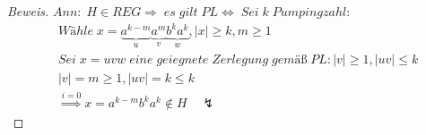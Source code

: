 \begin{proof}[Beweis]
	\begin{math}
		Ann:\;H\in REG\Rightarrow\;es\;gilt\;PL\Leftrightarrow\;Sei\;k\;Pumpingzahl:
	\end{math}
	\begin{align*}
		&Wähle\;x=\underbrace{a^{k-m}}_u\underbrace{a^m}_v\underbrace{b^ka^k}_w,\mid x\mid\ge k,m\ge1\\
		&Sei\;x=uvw\;eine\;geiegnete\;Zerlegung\;gemäß\;PL:\mid v\mid\ge1,\mid uv\mid\le k\\
		&\mid v\mid=m\ge1,\mid uv\mid = k\le k\\
		&\overset{i=0}{\Longrightarrow}x=a^{k-m}b^ka^k\notin H\quad\lightning
	\end{align*}
\end{proof}